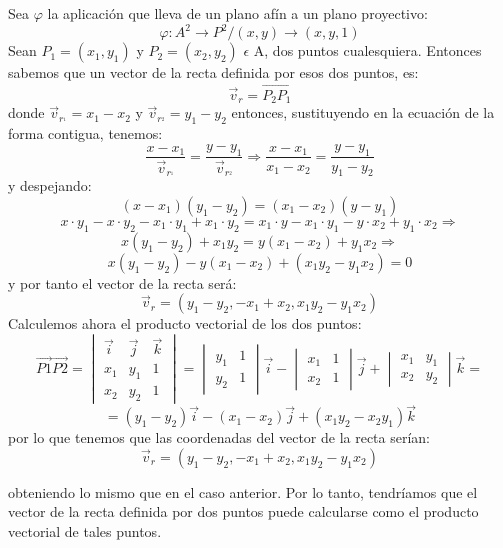 Sea $\varphi$ la aplicación que lleva de un plano afín a un plano proyectivo:
 \[\varphi : A^{2}\rightarrow P^{2} / (x,y)\rightarrow (x,y,1)\]
 Sean $P_{1}=(x_{1},y_{1})$ y $P_{2}=(x_{2},y_{2})$ $\epsilon$ A, dos puntos cualesquiera. Entonces sabemos que un vector de la recta definida
 por esos dos puntos, es:
 \[\vec{v}_{r}=\overrightarrow{P_{2}P_{1}}\]
donde  $  \vec{v}_{r^{_{1}}}=x_{1}-x_{2} $ y $ \vec{v}_{r^{_{2}}}=y_{1}-y_{2}$
entonces, sustituyendo en la ecuación de la forma contigua, tenemos:
\[\frac{x-x_{1}}{\vec{v}_{r^{_{1}}}}=\frac{y-y_{1}}{\vec{v}_{r^{_{2}}}}\Rightarrow \frac{x-x_{1}}{x_{1}-x_{2}}=\frac{y-y_{1}}{y_{1}-y_{2}}\]
y despejando:
\[(x-x_{1})(y_{1}-y_{2})=(x_{1}-x_{2})(y-y_{1})\]
\[x\cdot y_{1}-x\cdot y_{2}-x_{1}\cdot y_{1}+ x_{1}\cdot y_{2}=x_{1}\cdot y-x_{1}\cdot y_{1}-y\cdot x_{2}+y_{1}\cdot x_{2} \Rightarrow \]
\[x(y_{1}-y_{2})+x_{1}y_{2}=y(x_{1}-x_{2})+y_{1}x_{2} \Rightarrow \]
\[x(y_{1}-y_{2})-y(x_{1}-x_{2})+(x_{1}y_{2}-y_{1}x_{2})=0\]
y por tanto el vector de la recta será: \[ \vec{v}_{r}=(y_{1}-y_{2}, -x_{1}+x_{2}, x_{1}y_{2}-y_{1}x_{2})\]
\newline
Calculemos ahora el producto vectorial de los dos puntos:
\[
\vec{P1}\vec{P2}=\begin{vmatrix}
\vec{i} &\vec{j}  &\vec{k} \\
 x_{1}& y_{1} &1 \\
 x_{2}& y_{2} &1
\end{vmatrix}=\begin{vmatrix}
 y_{1}&1 \\
 y_{2}&1
\end{vmatrix}\vec{i}-\begin{vmatrix}
x_{1} & 1\\
 x_{2}&1
\end{vmatrix}\vec{j}+\begin{vmatrix}
 x_{1}&y_{1} \\
 x_{2}&y_{2}
\end{vmatrix}\vec{k}=
\]
\[=(y_{1}-y_{2})\vec{i}-(x_{1}-x_{2})\vec{j}+(x_{1}y_{2}-x_{2}y_{1})\vec{k}\]
por lo que tenemos que las coordenadas del vector de la recta serían:
\[ \vec{v}_{r}=(y_{1}-y_{2}, -x_{1}+x_{2}, x_{1}y_{2}-y_{1}x_{2})\]

obteniendo lo mismo que en el caso anterior. Por lo tanto, tendríamos que el vector de la recta definida por
dos puntos puede calcularse como el producto vectorial de tales puntos.
